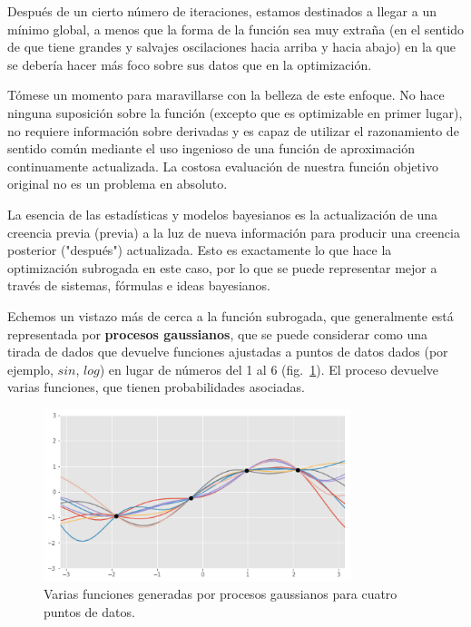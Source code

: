 \documentclass[a4paper,12pt]{article}
\begin{document}
Después de un cierto número de iteraciones, estamos destinados a llegar a un mínimo global, a menos que la forma de la función sea muy extraña (en el sentido de que tiene grandes y salvajes oscilaciones hacia arriba y hacia abajo) en la que se debería hacer más foco sobre sus datos que en la optimización.

Tómese un momento para maravillarse con la belleza de este enfoque. No hace ninguna suposición sobre la función (excepto que es optimizable en primer lugar), no requiere información sobre derivadas y es capaz de utilizar el razonamiento de sentido común mediante el uso ingenioso de una función de aproximación continuamente actualizada. La costosa evaluación de nuestra función objetivo original no es un problema en absoluto.

La esencia de las estadísticas y modelos bayesianos es la actualización de una creencia previa (previa) a la luz de nueva información para producir una creencia posterior ("después") actualizada. Esto es exactamente lo que hace la optimización subrogada en este caso, por lo que se puede representar mejor a través de sistemas, fórmulas e ideas bayesianos.

Echemos un vistazo más de cerca a la función subrogada, que generalmente está representada por \textbf{procesos gaussianos}, que se puede considerar como una tirada de dados que devuelve funciones ajustadas a puntos de datos dados (por ejemplo, $sin$, $log$) en lugar de números del 1 al 6 (fig.~\ref{fig:bayes4}). El proceso devuelve varias funciones, que tienen probabilidades asociadas.

\begin{figure}[H]
	\begin{center}
	\includegraphics[width=0.8\textwidth]{bayes_opt_4.png}
  	\caption{Varias funciones generadas por procesos gaussianos para cuatro puntos de datos.}
  	\label{fig:bayes4}
  	\end{center}
\end{figure}
\end{document}
